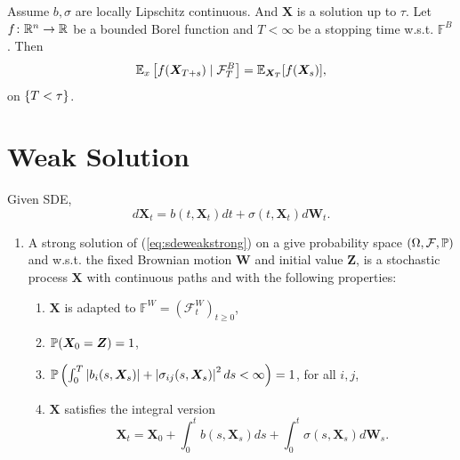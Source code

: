 \begin{thm}
    Assume $b,\sigma$ are locally Lipschitz continuous. And $\bm{X}$ is a solution up to $\tau$. Let $f \colon \mathbb{R}^n \rightarrow \mathbb{R}$ be a bounded Borel function and $T < \infty$ be a stopping time w.s.t. $\mathbb{F}^B$. Then
    \begin{equation*}
        \mathbb{E}_x\left[f(\bm{X}_{T+s}) \mid \mathcal{F}^B_T\right] = \mathbb{E}_{\bm{X}_T}[f(\bm{X}_s)],
    \end{equation*}
    on $\left\{T < \tau\right\}$.
\end{thm}

\section{Weak Solution}

\begin{defn}
    Given SDE,
    \begin{equation}\label{eq:sdeweakstrong}
        d\bm{X}_t = b(t,\bm{X}_t)dt+\sigma(t,\bm{X}_t)d\bm{W}_t.
    \end{equation}
    \begin{enumerate}[label=(\arabic{*})]
        \item A strong solution of (\ref{eq:sdeweakstrong}) on a give probability space $(\Omega,\mathcal{F},\mathbb{P})$ and w.s.t. the fixed Brownian motion $\bm{W}$ and initial value $\bm{Z}$, is a stochastic process $\bm{X}$ with continuous paths and with the following properties:
        \begin{enumerate}[label=(\roman*)]
            \item $\bm{X}$ is adapted to $\mathbb{F}^W = (\mathcal{F}^W_t)_{t \geq 0}$,
            \item $\mathbb{P}(\bm{X}_0 = \bm{Z}) = 1$,
            \item $\mathbb{P}\left(\int_0^T \left\lvert b_i(s,\bm{X}_s)\right\lvert + \left\lvert\sigma_{ij}(s,\bm{X}_s)\right\lvert^2 ds < \infty\right) = 1$, for all $i,j$,
            \item $\bm{X}$ satisfies the integral version
            \begin{equation*}
                \bm{X}_t = \bm{X}_0 + \int_0^tb(s,\bm{X}_s)ds+\int_0^t\sigma(s,\bm{X}_s)d\bm{W}_s.
            \end{equation*}
        \end{enumerate}


\end{enumerate}
\end{defn}

